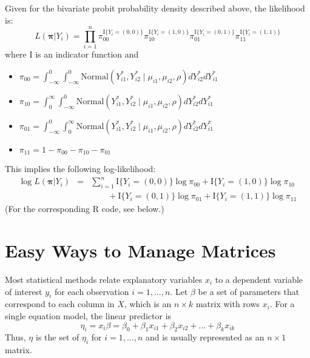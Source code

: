 Given for the bivariate probit probability density described above,
the likelihood is:
\begin{displaymath}
L(\mathbf{\pi} | Y_i) = \prod_{i=1}^n 
                    \pi_{00}^{\textrm{I}\{Y_i = (0,0)\}}
                    \pi_{10}^{\textrm{I}\{Y_i = (1,0)\}}
                    \pi_{01}^{\textrm{I}\{Y_i = (0,1)\}}
                    \pi_{11}^{\textrm{I}\{Y_i = (1,1)\}}
\end{displaymath}
where I is an indicator function and 
\begin{itemize}
\item $\pi_{00} = \int_{-\infty}^0 \int_{-\infty}^0 \textrm{Normal}(Y_{i1}^*, Y_{i2}^* \mid
\mu_{i1}, \mu_{i2}, \rho) dY_{i2}^* dY_{i1}^*$
\item $\pi_{10} = \int_0^{\infty} \int_{-\infty}^0 \textrm{Normal}(Y_{i1}^*, Y_{i2}^* \mid
\mu_{i1}, \mu_{i2}, \rho) dY_{i2}^* dY_{i1}^*$
\item $\pi_{01} = \int_{-\infty}^0 \int_0^{\infty} \textrm{Normal}(Y_{i1}^*, Y_{i2}^* \mid
\mu_{i1}, \mu_{i2}, \rho) dY_{i2}^* dY_{i1}^*$
\item $\pi_{11} = 1-\pi_{00}-\pi_{10}-\pi_{01}$
\end{itemize}
This implies the following log-likelihood:  
\begin{eqnarray*}
\log L(\mathbf{\pi} | Y_i) &=& \sum_{i=1}^n \textrm{I}\{Y_i = (0,0)\} \log\pi_{00}
+ \textrm{I}\{Y_i = (1,0)\} \log \pi_{10} \\
&& \quad \quad + \textrm{I}\{Y_i = (0,1)\} \log \pi_{01}
+ \textrm{I}\{Y_i = (1,1)\} \log \pi_{11}
\end{eqnarray*}
(For the corresponding R code, see  below.)  

\section{Easy Ways to Manage Matrices}
\label{constraints}

Most statistical methods relate explanatory variables $x_i$ to a
dependent variable of interest $y_i$ for each observation $i = 1,
\dots, n$.  Let $\beta$ be a set of parameters that correspond to each
column in $X$, which is an $n \times k$ matrix with rows $x_i$.  For a
single equation model, the linear predictor is
\begin{equation*}
\eta_i = x_i \beta = \beta_0 + \beta_1 x_{i1} +
\beta_2 x_{i2} + \dots + \beta_k x_{ik}
\end{equation*}
Thus, $\eta$ is the set of $\eta_i$ for $i = 1, \dots, n$ and is
usually represented as an $n \times 1$ matrix.

